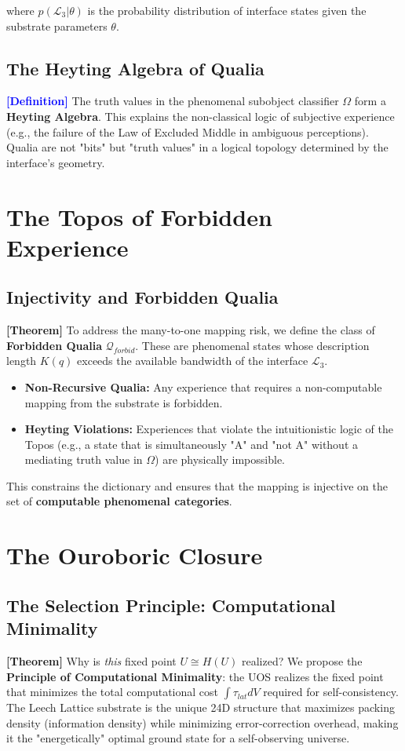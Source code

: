 \documentclass[11pt,titlepage]{article}
\newcommand{\interface}{\mathcal{L}_3}
\newcommand{\classifier}{\Omega}
\newcommand{\tagdef}{\textcolor{blue}{\textbf{[Definition]}} }
\newcommand{\tagtheo}{\textcolor{green!60!black}{\textbf{[Theorem]}} }
\begin{document}
where $p(\interface | \theta)$ is the probability distribution of interface states given the substrate parameters $\theta$.

\subsection{The Heyting Algebra of Qualia}
\tagdef The truth values in the phenomenal subobject classifier $\classifier$ form a \textbf{Heyting Algebra}. This explains the non-classical logic of subjective experience (e.g., the failure of the Law of Excluded Middle in ambiguous perceptions). Qualia are not "bits" but "truth values" in a logical topology determined by the interface's geometry.


\section{The Topos of Forbidden Experience}

\subsection{Injectivity and Forbidden Qualia}
\tagtheo To address the many-to-one mapping risk, we define the class of \textbf{Forbidden Qualia} $\mathcal{Q}_{forbid}$. These are phenomenal states whose description length $K(q)$ exceeds the available bandwidth of the interface $\interface$.
\begin{itemize}
    \item \textbf{Non-Recursive Qualia:} Any experience that requires a non-computable mapping from the substrate is forbidden.
    \item \textbf{Heyting Violations:} Experiences that violate the intuitionistic logic of the Topos (e.g., a state that is simultaneously "A" and "not A" without a mediating truth value in $\classifier$) are physically impossible.
\end{itemize}
This constrains the dictionary and ensures that the mapping is injective on the set of \textbf{computable phenomenal categories}.
\section{The Ouroboric Closure}

\subsection{The Selection Principle: Computational Minimality}
\tagtheo Why is \textit{this} fixed point $U \cong H(U)$ realized? We propose the \textbf{Principle of Computational Minimality}: the UOS realizes the fixed point that minimizes the total computational cost $\int \tau_{lat} dV$ required for self-consistency. The Leech Lattice substrate is the unique 24D structure that maximizes packing density (information density) while minimizing error-correction overhead, making it the "energetically" optimal ground state for a self-observing universe.
\end{document}
